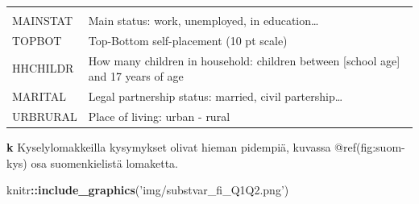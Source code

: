 \documentclass[
  finnish,
]{book}
\newenvironment{Shaded}{\begin{snugshade}}{\end{snugshade}}
\newcommand{\KeywordTok}[1]{\textcolor[rgb]{0.13,0.29,0.53}{\textbf{#1}}}
\newcommand{\NormalTok}[1]{#1}
\newcommand{\OperatorTok}[1]{\textcolor[rgb]{0.81,0.36,0.00}{\textbf{#1}}}
\newcommand{\StringTok}[1]{\textcolor[rgb]{0.31,0.60,0.02}{#1}}
\begin{document}
\begin{longtable}[]{@{}ll@{}}
\begin{minipage}[t]{0.85\columnwidth}
\end{minipage}\tabularnewline
\begin{minipage}[t]{0.09\columnwidth}\raggedright
MAINSTAT\strut
\end{minipage} & \begin{minipage}[t]{0.85\columnwidth}\raggedright
Main status: work, unemployed, in education\ldots{}\strut
\end{minipage}\tabularnewline
\begin{minipage}[t]{0.09\columnwidth}\raggedright
TOPBOT\strut
\end{minipage} & \begin{minipage}[t]{0.85\columnwidth}\raggedright
Top-Bottom self-placement (10 pt scale)\strut
\end{minipage}\tabularnewline
\begin{minipage}[t]{0.09\columnwidth}\raggedright
HHCHILDR\strut
\end{minipage} & \begin{minipage}[t]{0.85\columnwidth}\raggedright
How many children in household: children between {[}school age{]} and 17
years of age\strut
\end{minipage}\tabularnewline
\begin{minipage}[t]{0.09\columnwidth}\raggedright
MARITAL\strut
\end{minipage} & \begin{minipage}[t]{0.85\columnwidth}\raggedright
Legal partnership status: married, civil partership\ldots{}\strut
\end{minipage}\tabularnewline
\begin{minipage}[t]{0.09\columnwidth}\raggedright
URBRURAL\strut
\end{minipage} & \begin{minipage}[t]{0.85\columnwidth}\raggedright
Place of living: urban - rural\strut
\end{minipage}\tabularnewline
\bottomrule
\end{longtable}

\textbf{k} Kyselylomakkeilla kysymykset olivat hieman pidempiä, kuvassa
@ref(fig:suom-kys) osa suomenkielistä lomaketta.

\begin{Shaded}
\begin{Highlighting}[]
\NormalTok{knitr}\OperatorTok{::}\KeywordTok{include_graphics}\NormalTok{(}\StringTok{'img/substvar_fi_Q1Q2.png'}\NormalTok{)}
\end{Highlighting}
\end{Shaded}
\end{document}
